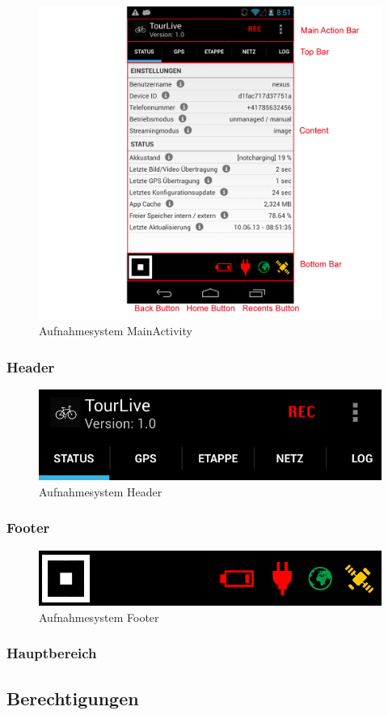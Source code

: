 \begin{figure}[H]
	\centering
	\includegraphics[width=150mm]{images/android/status.png}
	\caption{Aufnahmesystem MainActivity}
\end{figure}


\subsubsection{Header}
\begin{figure}[H]
	\centering
	\includegraphics[width=150mm]{images/android/header.png}
	\caption{Aufnahmesystem Header}
\end{figure}



\subsubsection{Footer}
\begin{figure}[H]
	\centering
	\includegraphics[width=150mm]{images/android/footer.png}
	\caption{Aufnahmesystem Footer}
\end{figure}

\subsubsection{Hauptbereich}

\subsection{Berechtigungen}

